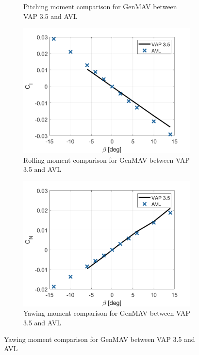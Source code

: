 \begin{figure}[H]
\begin{subfigure}[b]{0.45\textwidth}
              \caption{Pitching moment comparison for GenMAV between VAP 3.5 and AVL \cite{Stewart2007}}
               \label{fig:genMAV_Cm}
     \end{subfigure}
     \begin{subfigure}[b]{0.45\textwidth}
            \centering
         \includegraphics[width=\textwidth]{05_Results/Figs/VAP/genMAV/GenMAVModelValidation2.png}
        
         \caption{Rolling moment comparison for GenMAV between VAP 3.5 and AVL \cite{Stewart2007}}
          \label{fig:genMAV_Cl_roll}

     \end{subfigure}
     \begin{subfigure}[b]{0.45\textwidth}
               \centering
         \includegraphics[width=\textwidth]{05_Results/Figs/VAP/genMAV/GenMAVModelValidation3.png}
         
         \caption{Yawing moment comparison for GenMAV between VAP 3.5 and AVL \cite{Stewart2007}}
         \label{fig:genMAV_Cn}
     \end{subfigure}
\end{figure}








